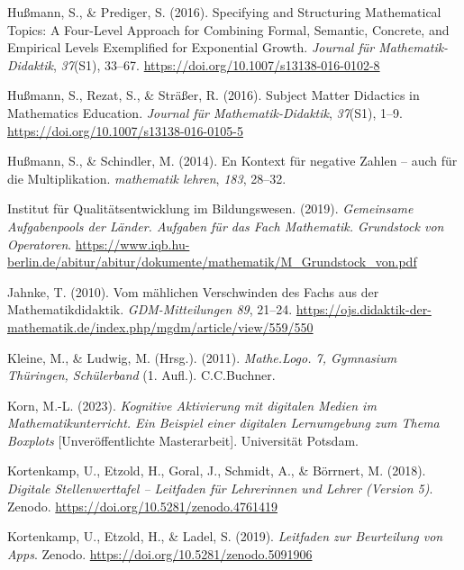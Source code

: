 \documentclass[
]{scrbook}
\newlength{\cslhangindent}
\newlength{\cslentryspacingunit} %
\newenvironment{CSLReferences}[2] %
 {%
  \setlength{\parindent}{0pt}
  \ifodd #1
  \let\oldpar\par
  \def\par{\hangindent=\cslhangindent\oldpar}
  \fi
  \setlength{\parskip}{#2\cslentryspacingunit}
 }%
 {}
\theoremstyle{definition}
\theoremstyle{definition}
\theoremstyle{definition}
\theoremstyle{definition}
\theoremstyle{remark}
\begin{document}
\begin{CSLReferences}{1}{0}
\leavevmode{}%
Hußmann, S., \& Prediger, S. (2016). Specifying and Structuring Mathematical Topics: A Four-Level Approach for Combining Formal, Semantic, Concrete, and Empirical Levels Exemplified for Exponential Growth. \emph{Journal für Mathematik-Didaktik}, \emph{37}(S1), 33--67. \url{https://doi.org/10.1007/s13138-016-0102-8}

\leavevmode{}%
Hußmann, S., Rezat, S., \& Sträßer, R. (2016). Subject {Matter} {Didactics} in {Mathematics} {Education}. \emph{Journal für Mathematik-Didaktik}, \emph{37}(S1), 1--9. \url{https://doi.org/10.1007/s13138-016-0105-5}

\leavevmode{}%
Hußmann, S., \& Schindler, M. (2014). En {Kontext} für negative {Zahlen} -- auch für die {Multiplikation}. \emph{mathematik lehren}, \emph{183}, 28--32.

\leavevmode{}%
Institut für Qualitätsentwicklung im Bildungswesen. (2019). \emph{Gemeinsame {Aufgabenpools} der {Länder}. {Aufgaben} für das {Fach} {Mathematik}. {Grundstock} von {Operatoren}}. \url{https://www.iqb.hu-berlin.de/abitur/abitur/dokumente/mathematik/M_Grundstock_von.pdf}

\leavevmode{}%
Jahnke, T. (2010). Vom mählichen {Verschwinden} des {Fachs} aus der {Mathematikdidaktik}. \emph{GDM-Mitteilungen 89}, 21--24. \url{https://ojs.didaktik-der-mathematik.de/index.php/mgdm/article/view/559/550}

\leavevmode{}%
Kleine, M., \& Ludwig, M. (Hrsg.). (2011). \emph{Mathe.{Logo}. 7, {Gymnasium} {Thüringen}, {Schülerband}} (1. Aufl.). C.C.Buchner.

\leavevmode{}%
Korn, M.-L. (2023). \emph{Kognitive Aktivierung mit digitalen Medien im Mathematikunterricht. Ein Beispiel einer digitalen Lernumgebung zum Thema Boxplots} {[}Unveröffentlichte Masterarbeit{]}. Universität Potsdam.

\leavevmode{}%
Kortenkamp, U., Etzold, H., Goral, J., Schmidt, A., \& Börrnert, M. (2018). \emph{Digitale {Stellenwerttafel} -- {Leitfaden} für {Lehrerinnen} und {Lehrer} ({Version} 5)}. Zenodo. \url{https://doi.org/10.5281/zenodo.4761419}

\leavevmode{}%
Kortenkamp, U., Etzold, H., \& Ladel, S. (2019). \emph{Leitfaden zur {Beurteilung} von {Apps}}. Zenodo. \url{https://doi.org/10.5281/zenodo.5091906}


\end{CSLReferences}
\end{document}
